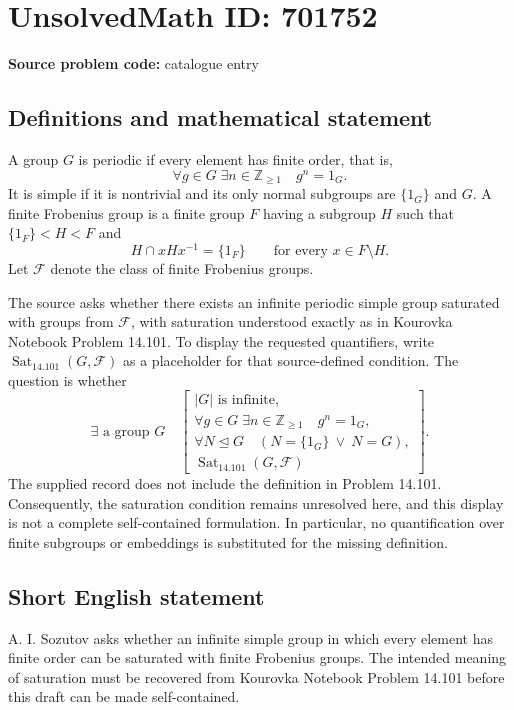 \documentclass[11pt]{article}
\newcommand{\Z}{\mathbb{Z}}
\begin{document}
\section*{UnsolvedMath ID: 701752}
\textbf{Source problem code:} catalogue entry
\subsection{Definitions and mathematical statement}
A group \(G\) is periodic if every element has finite order, that is,
\[
\forall g\in G\;\exists n\in\Z_{\geq 1}\quad g^n=1_G.
\]
It is simple if it is nontrivial and its only normal subgroups are \(\{1_G\}\) and \(G\). A finite Frobenius group is a finite group \(F\) having a subgroup \(H\) such that \(\{1_F\}<H<F\) and
\[
H\cap xHx^{-1}=\{1_F\}\qquad\text{for every }x\in F\setminus H.
\]
Let \(\mathcal F\) denote the class of finite Frobenius groups.

The source asks whether there exists an infinite periodic simple group saturated with groups from \(\mathcal F\), with saturation understood exactly as in Kourovka Notebook Problem 14.101. To display the requested quantifiers, write \(\operatorname{Sat}_{14.101}(G,\mathcal F)\) as a placeholder for that source-defined condition. The question is whether
\[
\exists\text{ a group }G\quad
\left[
\begin{gathered}
|G|\text{ is infinite},\\
\forall g\in G\;\exists n\in\Z_{\geq 1}\quad g^n=1_G,\\
\forall N\trianglelefteq G\quad (N=\{1_G\}\ \lor\ N=G),\\
\operatorname{Sat}_{14.101}(G,\mathcal F)
\end{gathered}
\right].
\]
The supplied record does not include the definition in Problem 14.101. Consequently, the saturation condition remains unresolved here, and this display is not a complete self-contained formulation. In particular, no quantification over finite subgroups or embeddings is substituted for the missing definition.
\subsection{Short English statement}
A. I. Sozutov asks whether an infinite simple group in which every element has finite order can be saturated with finite Frobenius groups. The intended meaning of saturation must be recovered from Kourovka Notebook Problem 14.101 before this draft can be made self-contained.
\end{document}
